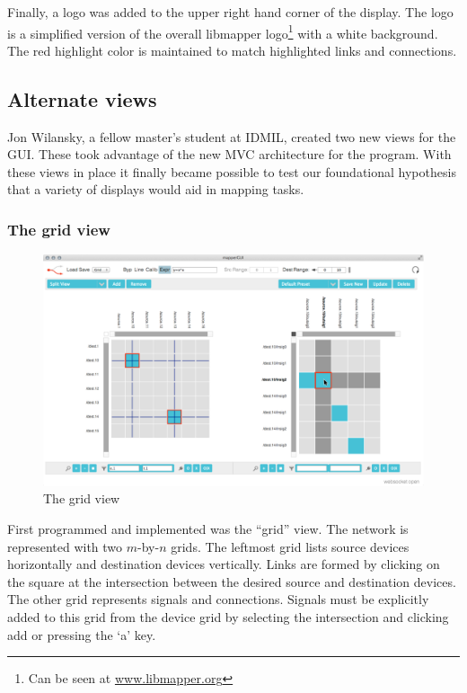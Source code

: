 Finally, a logo was added to the upper right hand corner of the display. The logo is a simplified version of the overall libmapper logo\footnote{Can be seen at \url{www.libmapper.org}} with a white background. The red highlight color is maintained to match highlighted links and connections.


	\subsection{Alternate views} %
	\label{sec:alternate_views}

Jon Wilansky, a fellow master's student at IDMIL, created two new views for the GUI. These took advantage of the new MVC architecture for the program. With these views in place it finally became possible to test our foundational hypothesis that a variety of displays would aid in mapping tasks.

		\subsubsection{The grid view}

\begin{figure}[ht]
\centering
	\includegraphics[width=\textwidth]{figures/grid_w_cursor}
\caption{The grid view}
\label{fig:grid}
\end{figure}

First programmed and implemented was the ``grid'' view. The network is represented with two $m$-by-$n$ grids. The leftmost grid lists source devices horizontally and destination devices vertically. Links are formed by clicking on the square at the intersection between the desired source and destination devices. The other grid represents signals and connections. Signals must be explicitly added to this grid from the device grid by selecting the intersection and clicking add or pressing the `a' key. 

